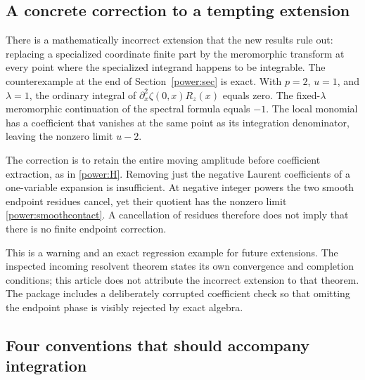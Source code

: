 \subsection{A concrete correction to a tempting extension}

There is a mathematically incorrect extension that the new results
rule out: replacing a specialized coordinate finite part by the
meromorphic transform at every point where the specialized integrand
happens to be integrable. The counterexample at the end of
Section~\ref{power:sec} is exact. With $p=2$, $u=1$, and
$\lambda=1$, the ordinary integral of
$\partial_x^2\zeta(0,x)R_z(x)$ equals zero. The fixed-$\lambda$
meromorphic continuation of the spectral formula equals $-1$.
The local monomial has a coefficient that vanishes at the same
point as its integration denominator, leaving the nonzero limit
$u-2$.

The correction is to retain the entire moving amplitude before
coefficient extraction, as in \eqref{power:H}. Removing just the
negative Laurent coefficients of a one-variable expansion is
insufficient. At negative integer powers the two smooth endpoint
residues cancel, yet their quotient has the nonzero limit
\eqref{power:smoothcontact}. A cancellation of residues therefore
does not imply that there is no finite endpoint correction.

This is a warning and an exact regression example for future
extensions. The inspected incoming resolvent theorem states its
own convergence and completion conditions; this article does not
attribute the incorrect extension to that theorem. The package
includes a deliberately corrupted coefficient check so that
omitting the endpoint phase is visibly rejected by exact algebra.

\subsection{Four conventions that should accompany integration}

